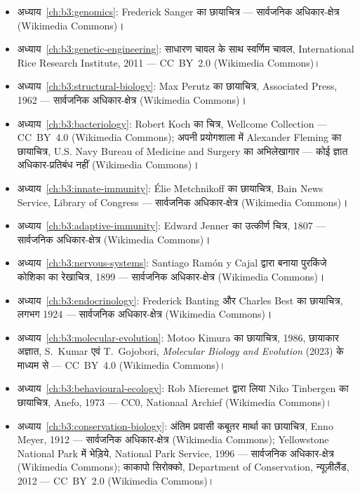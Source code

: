 \begin{itemize}
  \item अध्याय~\ref{ch:b3:genomics}: Frederick Sanger का छायाचित्र ---
        सार्वजनिक अधिकार-क्षेत्र (Wikimedia Commons)।
  \item अध्याय~\ref{ch:b3:genetic-engineering}: साधारण चावल के साथ
        स्वर्णिम चावल, International Rice Research Institute, 2011 ---
        CC~BY~2.0 (Wikimedia Commons)।
  \item अध्याय~\ref{ch:b3:structural-biology}: Max Perutz का छायाचित्र,
        Associated Press, 1962 --- सार्वजनिक अधिकार-क्षेत्र
        (Wikimedia Commons)।
  \item अध्याय~\ref{ch:b3:bacteriology}: Robert Koch का चित्र, Wellcome
        Collection --- CC~BY~4.0 (Wikimedia Commons); अपनी प्रयोगशाला
        में Alexander Fleming का छायाचित्र, U.S. Navy Bureau of Medicine
        and Surgery का अभिलेखागार --- कोई ज्ञात अधिकार-प्रतिबंध नहीं
        (Wikimedia Commons)।
  \item अध्याय~\ref{ch:b3:innate-immunity}: Élie Metchnikoff का
        छायाचित्र, Bain News Service, Library of Congress ---
        सार्वजनिक अधिकार-क्षेत्र (Wikimedia Commons)।
  \item अध्याय~\ref{ch:b3:adaptive-immunity}: Edward Jenner का उत्कीर्ण
        चित्र, 1807 --- सार्वजनिक अधिकार-क्षेत्र (Wikimedia Commons)।
  \item अध्याय~\ref{ch:b3:nervous-systems}: Santiago Ramón y Cajal
        द्वारा बनाया पुरकिंजे कोशिका का रेखाचित्र, 1899 --- सार्वजनिक
        अधिकार-क्षेत्र (Wikimedia Commons)।
  \item अध्याय~\ref{ch:b3:endocrinology}: Frederick Banting और Charles
        Best का छायाचित्र, लगभग 1924 --- सार्वजनिक अधिकार-क्षेत्र
        (Wikimedia Commons)।
  \item अध्याय~\ref{ch:b3:molecular-evolution}: Motoo Kimura का
        छायाचित्र, 1986, छायाकार अज्ञात, S.~Kumar एवं T.~Gojobori,
        \emph{Molecular Biology and Evolution} (2023) के माध्यम से ---
        CC~BY~4.0 (Wikimedia Commons)।
  \item अध्याय~\ref{ch:b3:behavioural-ecology}: Rob Mieremet द्वारा
        लिया Niko Tinbergen का छायाचित्र, Anefo, 1973 --- CC0,
        Nationaal Archief (Wikimedia Commons)।
  \item अध्याय~\ref{ch:b3:conservation-biology}: अंतिम प्रवासी कबूतर
        मार्था का छायाचित्र, Enno Meyer, 1912 --- सार्वजनिक
        अधिकार-क्षेत्र (Wikimedia Commons); Yellowstone National Park
        में भेड़िये, National Park Service, 1996 --- सार्वजनिक
        अधिकार-क्षेत्र (Wikimedia Commons); काकापो सिरोक्को, Department
        of Conservation, न्यूज़ीलैंड, 2012 --- CC~BY~2.0
        (Wikimedia Commons)।
\end{itemize}

